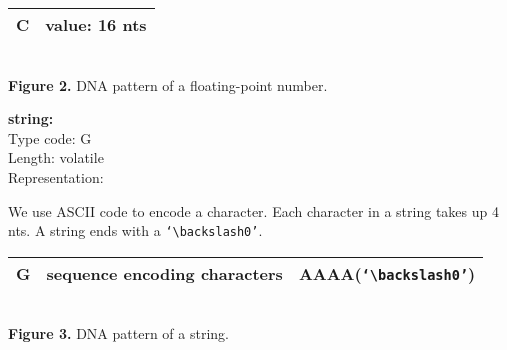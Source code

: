 \documentclass{article}
\begin{document}
%

\begin{center}
    \begin{tabular}{|c|c|}
        \hline
        C & value: 16 nts \\
        \hline
    \end{tabular}
    \\[3pt]{\small \textbf{Figure 2.} DNA pattern of a floating-point number.}
\end{center}
\textbf{string:}\\
Type code: G\\
Length: volatile\\
Representation:
\par We use ASCII code to encode a character. Each character in a string takes up 4 nts. A string ends with a \texttt{`$\backslash$0'}.
\begin{center}
    \begin{tabular}{|c|c|c|}
        \hline
        G & sequence encoding characters & AAAA(\texttt{`$\backslash$0'})\\
        \hline
    \end{tabular}
    \\[3pt]{\small \textbf{Figure 3.} DNA pattern of a string.}
\end{center}
\end{document}

